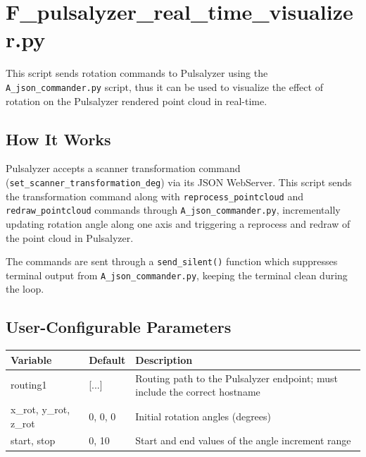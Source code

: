 \chapter{F\_pulsalyzer\_real\_time\_visualizer.py}
\label{ch:scriptF}

This script sends rotation commands to Pulsalyzer using the \texttt{A\_json\_commander.py} script, thus it can be used to visualize the effect of rotation on the Pulsalyzer rendered point cloud in real-time.

\section{How It Works}
Pulsalyzer accepts a scanner transformation command (\texttt{set\_scanner\_transformation\_deg}) via its JSON WebServer. This script sends the transformation command along with \texttt{reprocess\_pointcloud} and \texttt{redraw\_pointcloud} commands through \texttt{A\_json\_commander.py}, incrementally updating rotation angle along one axis and triggering a reprocess and redraw of the point cloud in Pulsalyzer.

The commands are sent through a \texttt{send\_silent()} function which suppresses terminal output from \texttt{A\_json\_commander.py}, keeping the terminal clean during the loop.

\section{User-Configurable Parameters}
\begin{table}[!ht]
    \centering
    \begin{tabularx}{\textwidth}{llX}
        \toprule
        Variable               & Default & Description                                                                \\
        \midrule
        routing1               & [...]   & Routing path to the Pulsalyzer endpoint; must include the correct hostname \\
        x\_rot, y\_rot, z\_rot & 0, 0, 0 & Initial rotation angles (degrees)                                          \\
        start, stop            & 0, 10   & Start and end values of the angle increment range                          \\
        \bottomrule
    \end{tabularx}
\end{table}

